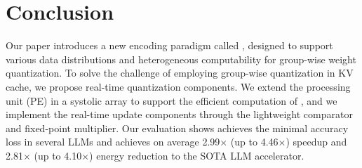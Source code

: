 

\section{Conclusion}
\label{sec:conclusion}
Our paper introduces a new encoding paradigm called \proj, designed to support various data distributions and heterogeneous computability for group-wise weight quantization.
To solve the challenge of employing group-wise quantization in KV cache, we propose real-time quantization components.
We extend the processing unit (PE) in a systolic array to support the efficient computation of \proj, and we implement the real-time update components through the lightweight comparator and fixed-point multiplier.
Our evaluation shows \proj achieves the minimal accuracy loss in several LLMs and achieves on average 2.99$\times$ (up to 4.46$\times$) speedup and 2.81$\times$ (up to 4.10$\times$) energy reduction to the SOTA LLM accelerator.